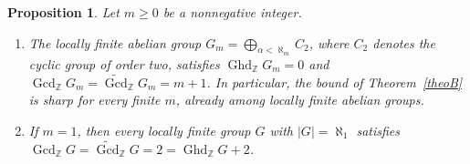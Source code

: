 \documentclass[12pt]{amsart}
\newtheorem{proposition}[theorem]{Proposition}
\theoremstyle{remark}
\newtheorem{remark}[theorem]{Remark}
\theoremstyle{definition}
\theoremstyle{plain}
\DeclareMathOperator{\Ghd}{Ghd}
\DeclareMathOperator{\Gcd}{Gcd}
\DeclareMathOperator{\cd}{cd}
\DeclareMathOperator{\hd}{hd}
\newcommand{\PGFcd}{\widetilde{\Gcd}}
\newcommand{\Z}{\mathbb{Z}}
\newcommand{\Q}{\mathbb{Q}}
\begin{document}

\begin{proposition}\label{prop5.4}
Let $m\geq0$ be a nonnegative integer.
\begin{enumerate}
\item[(i)] The locally finite abelian group $G_m=\bigoplus_{\alpha<\aleph_m}C_2$, where $C_2$ denotes the cyclic group of order two, satisfies $\Ghd_{\mathbb Z}G_m=0$ and $\Gcd_{\mathbb Z}G_m=\PGFcd_{\mathbb Z}G_m=m+1$. In particular, the bound of Theorem~\ref{theoB} is sharp for every finite $m$, already among locally finite abelian groups.
\item[(ii)] If $m=1$, then every locally finite group $G$ with $|G|=\aleph_1$ satisfies $\Gcd_{\mathbb Z}G=\PGFcd_{\mathbb Z}G=2=\Ghd_{\mathbb Z}G+2$.
\end{enumerate}\end{proposition}
\end{document}
